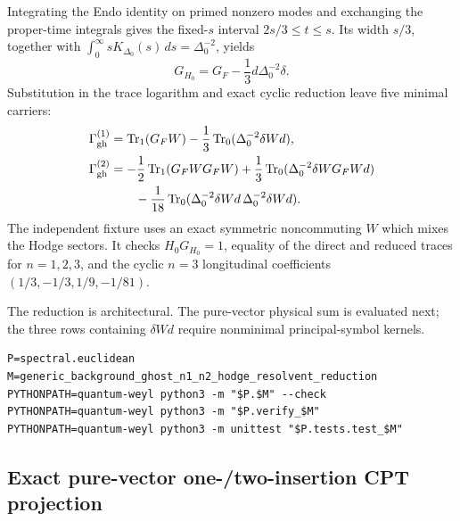 \documentclass[11pt]{article}
\theoremstyle{definition}
\theoremstyle{remark}
\begin{document}
Integrating the Endo identity on primed nonzero modes and exchanging the
proper-time integrals gives the fixed-$s$ interval $2s/3\leq t\leq s$.
Its width $s/3$, together with
$\int_0^\infty sK_{\Delta_0}(s)\,ds=\Delta_0^{-2}$, yields
\[
 G_{H_0}=G_F-\frac13d\Delta_0^{-2}\delta .
\]
Substitution in the trace logarithm and exact cyclic reduction leave five
minimal carriers:
\begin{align*}
 \Gamma^{(1)}_{\rm gh}
 &=\operatorname{Tr}_1(G_FW)-\frac13\operatorname{Tr}_0(\Delta_0^{-2}\delta Wd),\\
 \Gamma^{(2)}_{\rm gh}
 &=-\frac12\operatorname{Tr}_1(G_FW G_FW)
   +\frac13\operatorname{Tr}_0(\Delta_0^{-2}\delta W G_FWd)\\
 &\qquad-\frac1{18}\operatorname{Tr}_0(\Delta_0^{-2}\delta Wd\,
                              \Delta_0^{-2}\delta Wd).
\end{align*}
The independent fixture uses an exact symmetric noncommuting $W$ which mixes
the Hodge sectors.  It checks $H_0G_{H_0}=1$, equality of the direct and
reduced traces for $n=1,2,3$, and the cyclic $n=3$ longitudinal coefficients
$(1/3,-1/3,1/9,-1/81)$.

The reduction is architectural.  The pure-vector physical sum is evaluated
next; the three rows containing $\delta Wd$ require nonminimal
principal-symbol kernels.

\begin{verbatim}
P=spectral.euclidean
M=generic_background_ghost_n1_n2_hodge_resolvent_reduction
PYTHONPATH=quantum-weyl python3 -m "$P.$M" --check
PYTHONPATH=quantum-weyl python3 -m "$P.verify_$M"
PYTHONPATH=quantum-weyl python3 -m unittest "$P.tests.test_$M"
\end{verbatim}

\subsection{Exact pure-vector one-/two-insertion CPT projection}
\end{document}

